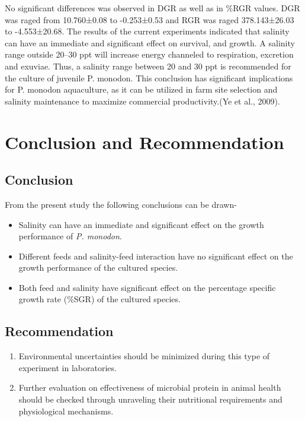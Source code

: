 \documentclass[
]{book}
\begin{document}
No significant differences was observed in DGR as well as in \%RGR values. DGR was raged from
10.760±0.08 to -0.253±0.53 and RGR was raged 378.143±26.03 to -4.553±20.68. The results of
the current experiments indicated that salinity can have an immediate and significant effect on
survival, and growth. A salinity range outside 20--30 ppt will increase energy channeled to
respiration, excretion and exuviae. Thus, a salinity range between 20 and 30 ppt is recommended
for the culture of juvenile P. monodon. This conclusion has significant implications for P.
monodon aquaculture, as it can be utilized in farm site selection and salinity maintenance to
maximize commercial productivity.(Ye et al., 2009).

\hypertarget{conclusion-and-recommendation}{%
\chapter{Conclusion and Recommendation}\label{conclusion-and-recommendation}}

\hypertarget{conclusion}{%
\section{Conclusion}\label{conclusion}}

From the present study the following conclusions can be drawn-

\begin{itemize}
\item
  Salinity can have an immediate and significant effect on the growth
  performance of \emph{P. monodon}.
\item
  Different feeds and salinity-feed interaction have no significant
  effect on the growth performance of the cultured species.
\item
  Both feed and salinity have significant effect on the percentage
  specific growth rate (\%SGR) of the cultured species.
\end{itemize}

\hypertarget{recommendation}{%
\section{Recommendation}\label{recommendation}}

\begin{enumerate}
\def\labelenumi{\arabic{enumi}.}
\item
  Environmental uncertainties should be minimized during this type of
  experiment in laboratories.
\item
  Further evaluation on effectiveness of microbial protein in animal
  health should be checked through unraveling their nutritional
  requirements and physiological mechanisms.
\end{enumerate}
\end{document}
